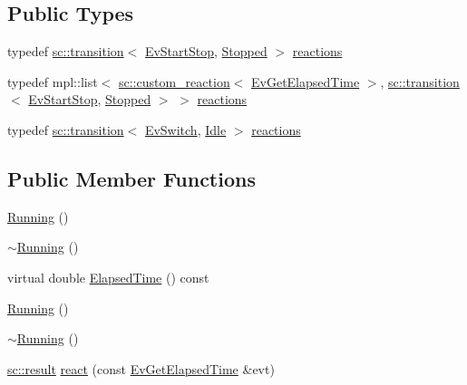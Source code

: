 \subsection*{Public Types}
\begin{DoxyCompactItemize}
\item 
typedef \mbox{\hyperlink{classboost_1_1statechart_1_1transition}{sc\+::transition}}$<$ \mbox{\hyperlink{struct_ev_start_stop}{Ev\+Start\+Stop}}, \mbox{\hyperlink{struct_stopped}{Stopped}} $>$ \mbox{\hyperlink{struct_running_a9c7d824351006514acf617bd07f2d222}{reactions}}
\item 
typedef mpl\+::list$<$ \mbox{\hyperlink{classboost_1_1statechart_1_1custom__reaction}{sc\+::custom\+\_\+reaction}}$<$ \mbox{\hyperlink{struct_ev_get_elapsed_time}{Ev\+Get\+Elapsed\+Time}} $>$, \mbox{\hyperlink{classboost_1_1statechart_1_1transition}{sc\+::transition}}$<$ \mbox{\hyperlink{struct_ev_start_stop}{Ev\+Start\+Stop}}, \mbox{\hyperlink{struct_stopped}{Stopped}} $>$ $>$ \mbox{\hyperlink{struct_running_a5966603a0d610f1db7878871d96d7737}{reactions}}
\item 
typedef \mbox{\hyperlink{classboost_1_1statechart_1_1transition}{sc\+::transition}}$<$ \mbox{\hyperlink{struct_ev_switch}{Ev\+Switch}}, \mbox{\hyperlink{struct_idle}{Idle}} $>$ \mbox{\hyperlink{struct_running_af4d01d2d6379e26b9397780725578356}{reactions}}
\end{DoxyCompactItemize}
\subsection*{Public Member Functions}
\begin{DoxyCompactItemize}
\item 
\mbox{\hyperlink{struct_running_a4f9dd4f9c1b1ce72f2b65b13d9b4e65a}{Running}} ()
\item 
\mbox{\hyperlink{struct_running_a642965fca4984b52e6a65696380035ac}{$\sim$\+Running}} ()
\item 
virtual double \mbox{\hyperlink{struct_running_ac9d1d116f030428827757e3a5289d94a}{Elapsed\+Time}} () const
\item 
\mbox{\hyperlink{struct_running_a4f9dd4f9c1b1ce72f2b65b13d9b4e65a}{Running}} ()
\item 
\mbox{\hyperlink{struct_running_a642965fca4984b52e6a65696380035ac}{$\sim$\+Running}} ()
\item 
\mbox{\hyperlink{namespaceboost_1_1statechart_abe807f6598b614d6d87bb951ecd92331}{sc\+::result}} \mbox{\hyperlink{struct_running_ac2b99d336186c859e4425556619567fa}{react}} (const \mbox{\hyperlink{struct_ev_get_elapsed_time}{Ev\+Get\+Elapsed\+Time}} \&evt)
\end{DoxyCompactItemize}
